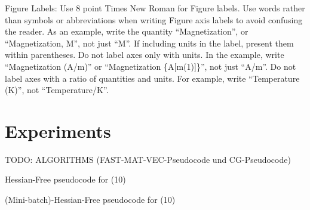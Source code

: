 \documentclass[conference]{IEEEtran}
\begin{document}
Figure Labels: Use 8 point Times New Roman for Figure labels. Use words 
rather than symbols or abbreviations when writing Figure axis labels to 
avoid confusing the reader. As an example, write the quantity 
``Magnetization'', or ``Magnetization, M'', not just ``M''. If including 
units in the label, present them within parentheses. Do not label axes only 
with units. In the example, write ``Magnetization (A/m)'' or ``Magnetization 
\{A[m(1)]\}'', not just ``A/m''. Do not label axes with a ratio of 
quantities and units. For example, write ``Temperature (K)'', not 
``Temperature/K''.

\section{Experiments}
TODO: ALGORITHMS (FAST-MAT-VEC-Pseudocode und CG-Pseudocode)

\begin{algorithm}
	\caption{Hessian-Free pseudocode for (10)}\label{alg:one}
\end{algorithm}

\begin{algorithm}
	\caption{(Mini-batch)-Hessian-Free pseudocode for (10)}\label{alg:two}
\end{algorithm}
\end{document}
